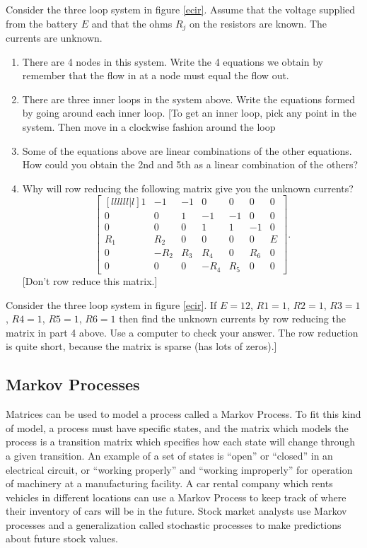 \begin{problem}
Consider the three loop system in figure \ref{ecir}. Assume that the voltage supplied from the battery $E$ and that the ohms $R_j$ on the resistors are known. The currents are unknown.
\begin{enumerate}
 \item There are 4 nodes in this system. Write the 4 equations we obtain by remember that the flow in at a node must equal the flow out. 
 \item There are three inner loops in the system above. Write the equations formed by going around each inner loop. [To get an inner loop, pick any point in the system. Then move in a clockwise fashion around the loop
 \item Some of the equations above are linear combinations of the other equations.  How could you obtain the 2nd and 5th as a linear combination of the others?
 \item Why will row reducing the following matrix give you the unknown currents? 
$$\begin{bmatrix}[llllll|l]
 1 & -1 & -1 & 0 & 0 & 0 & 0 \\
 0 & 0 & 1 & -1 & -1 & 0 & 0 \\
 0 & 0 & 0 & 1 & 1 & -1 & 0 \\
 R_1 & R_2 & 0 & 0 & 0 & 0 & E \\
 0 & -R_2 & R_3 & R_4 & 0 & R_6 & 0 \\
 0 & 0 & 0 & -R_4 & R_5 & 0 & 0
\end{bmatrix}.$$
[Don't row reduce this matrix.]
\end{enumerate}
\end{problem}


\begin{problem}
 Consider the three loop system in figure \ref{ecir}. If $E = 12$, $R1 = 1$, $R2 = 1$, $R3 = 1$, $R4 = 1$, $R5 = 1$, $R6 = 1$
 then find the unknown currents by row reducing the matrix in part 4 above. Use a computer to check your answer.  The row reduction is quite short, because the matrix is sparse (has lots of zeros).]
\end{problem}







\subsection{Markov Processes}
Matrices can be used to model a process called a Markov Process. To fit this kind of model, a process must have specific states, and the matrix which models the process is a transition matrix which specifies how each state will change through a given transition. An example of a set of states is ``open'' or ``closed'' in an electrical circuit, or ``working properly'' and ``working improperly'' for operation of machinery at a manufacturing facility. A car rental company which rents vehicles in different locations can use a Markov Process to keep track of where their inventory of cars will be in the future. Stock market analysts use Markov processes and a generalization called stochastic processes to make predictions about future stock values.

